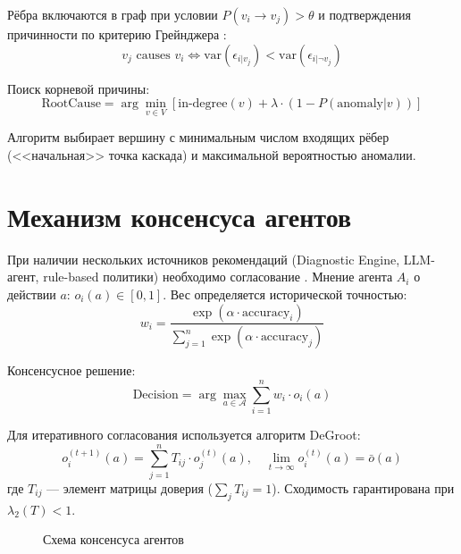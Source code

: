 Рёбра включаются в граф при условии $P(v_i \to v_j) > \theta$ и подтверждения причинности по критерию Грейнджера \cite{granger_causality}:
\begin{equation}
v_j \text{ causes } v_i \Leftrightarrow \text{var}(\epsilon_{i|v_j}) < \text{var}(\epsilon_{i|\neg v_j})
\label{eq:granger_causality_arch}
\end{equation}

Поиск корневой причины:
\begin{equation}
\text{RootCause} = \arg\min_{v \in V} \left[ \text{in-degree}(v) + \lambda \cdot (1 - P(\text{anomaly}|v)) \right]
\label{eq:root_cause}
\end{equation}

Алгоритм выбирает вершину с минимальным числом входящих рёбер (<<начальная>> точка каскада) и максимальной вероятностью аномалии.

\section{Механизм консенсуса агентов}

При наличии нескольких источников рекомендаций (Diagnostic Engine, LLM-агент, rule-based политики) необходимо согласование \cite{wooldridge_agents,herlihy_art_multiprocessor}. Мнение агента $A_i$ о действии $a$: $o_i(a) \in [0, 1]$. Вес определяется исторической точностью:
\begin{equation}
w_i = \frac{\exp(\alpha \cdot \text{accuracy}_i)}{\sum_{j=1}^{n} \exp(\alpha \cdot \text{accuracy}_j)}
\label{eq:agent_weight}
\end{equation}

Консенсусное решение:
\begin{equation}
\text{Decision} = \arg\max_{a \in \mathcal{A}} \sum_{i=1}^{n} w_i \cdot o_i(a)
\label{eq:consensus}
\end{equation}

Для итеративного согласования используется алгоритм DeGroot:
\begin{equation}
o_i^{(t+1)}(a) = \sum_{j=1}^{n} T_{ij} \cdot o_j^{(t)}(a), \quad \lim_{t \to \infty} o_i^{(t)}(a) = \bar{o}(a)
\label{eq:degroot_consensus}
\end{equation}
где $T_{ij}$ --- элемент матрицы доверия ($\sum_j T_{ij} = 1$). Сходимость гарантирована при $\lambda_2(T) < 1$.

\begin{figure}[H]
\centering
{}
\caption{Схема консенсуса агентов}
\label{fig:agent_consensus}
\end{figure}


